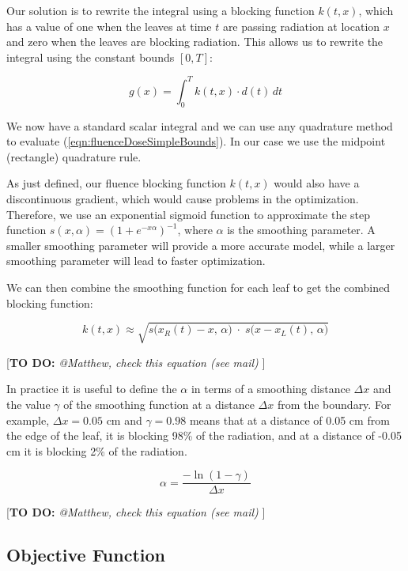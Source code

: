 \documentclass[12pt]{article}
\newcommand{\todo}[1]{{\color{lightblue}\par {[{\bf TO DO: } {\em #1}} ] \\    }}
\begin{document}
Our solution is to rewrite the integral using a blocking function $k(t,x)$, which has a value of one when the leaves at time $t$ are passing radiation at location $x$ and zero when the leaves are blocking radiation. This allows us to rewrite the integral using the constant bounds $[0, T]$:

\begin{equation}
  g(x) = \int_0^T \! k(t, x) \cdot d(t) \, dt
  \label{eqn:fluenceDoseSimpleBounds}
\end{equation}

We now have a standard scalar integral and we can use any quadrature method to evaluate (\ref{eqn:fluenceDoseSimpleBounds}).
In our case we use the midpoint (rectangle) quadrature rule.

As just defined, our fluence blocking function $k(t,x)$
would also have a discontinuous gradient, which would cause problems in the optimization.
Therefore, we use an exponential sigmoid function to approximate the step function
$s(x, \alpha) = (1 + e^{-x \alpha})^{-1}$, where $\alpha$ is the smoothing parameter. A smaller smoothing parameter will provide a more accurate model, while a larger smoothing parameter will lead to faster optimization.

We can then combine the smoothing function for each leaf to get the combined blocking function:

\begin{equation}
  k(t, x) \approx \sqrt{s\big(x_R(t) -x, \, \alpha\big) \; \cdot \; s\big(x -x_L(t), \, \alpha\big)}
\end{equation}

\todo{@Matthew, check this equation (see mail)}

In practice it is useful to define the $\alpha$ in terms of a smoothing distance $\Delta x$ and the
value $\gamma$ of the smoothing function at a distance $\Delta x$ from the boundary. For example, $\Delta x = 0.05$ cm and $\gamma = 0.98$ means that at a distance of 0.05 cm from the edge of the leaf, it is blocking 98\% of the radiation, and at a distance of -0.05 cm it is blocking 2\% of the radiation.

\begin{equation}
  \alpha = \frac{-\ln(1-\gamma)}{\Delta x}
  \label{eqn:SmoothingDistanceParameter}
\end{equation}
\todo{@Matthew, check this equation (see mail)}

\subsection{Objective Function}
\end{document}
